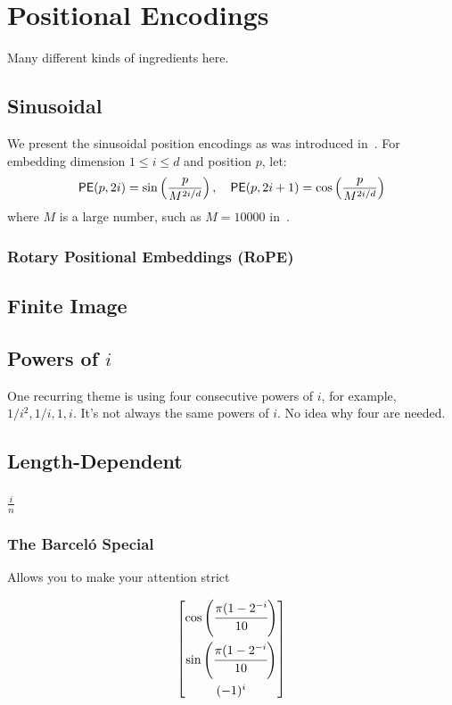 %
\chapter{Positional Encodings}
%

Many different kinds of ingredients here.

\section{Sinusoidal}

We present the sinusoidal position encodings as was introduced in~\citep{vaswani-etal-2017-attention}.
For embedding dimension \(1 \leq i \leq d\) and position \(p\), let:
\begin{align*}
    \mathsf{PE}(p, 2i) = \sin\left(\frac{p}{M^{2i/d}}\right),
    \quad
    \mathsf{PE}(p, 2i+1) = \cos\left(\frac{p}{M^{2i/d}}\right)
\end{align*}
where \(M\) is a large number, such as \(M = 10000\) in~\citep{vaswani-etal-2017-attention}.

\subsection{Rotary Positional Embeddings (RoPE)}
\cite{su2024roformer}


\section{Finite Image}

\section{Powers of $i$}

One recurring theme is using four consecutive powers of $i$, for example, $1/i^2, 1/i, 1, i$. It's not always the same powers of $i$. No idea why four are needed.

\section{Length-Dependent}

\subsection{$\frac{i}{n}$}

\subsection{The Barceló Special}

Allows you to make your attention strict 

\[\begin{bmatrix}
    \cos\left(\cfrac{\pi(1-2^{-i}}{10}\right)\\[3ex]
    \sin\left(\cfrac{\pi(1-2^{-i}}{10}\right)\\[3ex]
    (-1)^i
\end{bmatrix}\]